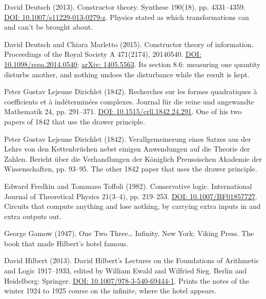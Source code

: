 \documentclass[11pt,twoside]{article}
\theoremstyle{thielethm}
\theoremstyle{thieledef}
\theoremstyle{thieledef}
\theoremstyle{thieledef}
\theoremstyle{thielethm}
\theoremstyle{thieleobs}
\theoremstyle{thielethm}
\begin{document}
\noindent David Deutsch (2013). Constructor theory. Synthese 190(18), pp. 4331--4359. \href{https://doi.org/10.1007/s11229-013-0279-z}{DOI: 10.1007/s11229-013-0279-z}. Physics stated as which transformations can and can't be brought about.
\par\medskip

\noindent David Deutsch and Chiara Marletto (2015). Constructor theory of information. Proceedings of the Royal Society A 471(2174), 20140540. \href{https://doi.org/10.1098/rspa.2014.0540}{DOI: 10.1098/rspa.2014.0540}; \href{https://arxiv.org/abs/1405.5563}{arXiv: 1405.5563}. Its section 8.6: measuring one quantity disturbs another, and nothing undoes the disturbance while the result is kept.
\par\medskip

\noindent Peter Gustav Lejeune Dirichlet (1842). Recherches sur les formes quadratiques \`a coefficients et \`a ind\'etermin\'ees complexes. Journal f\"ur die reine und angewandte Mathematik 24, pp. 291--371. \href{https://doi.org/10.1515/crll.1842.24.291}{DOI: 10.1515/crll.1842.24.291}. One of his two papers of 1842 that use the drawer principle.
\par\medskip

\noindent Peter Gustav Lejeune Dirichlet (1842). Verallgemeinerung eines Satzes aus der Lehre von den Kettenbr\"uchen nebst einigen Anwendungen auf die Theorie der Zahlen. Bericht \"uber die Verhandlungen der K\"oniglich Preussischen Akademie der Wissenschaften, pp. 93--95. The other 1842 paper that uses the drawer principle.
\par\medskip

\noindent Edward Fredkin and Tommaso Toffoli (1982). Conservative logic. International Journal of Theoretical Physics 21(3--4), pp. 219--253. \href{https://doi.org/10.1007/BF01857727}{DOI: 10.1007/BF01857727}. Circuits that compute anything and lose nothing, by carrying extra inputs in and extra outputs out.
\par\medskip

\noindent George Gamow (1947). One Two Three\ldots{} Infinity. New York: Viking Press. The book that made Hilbert's hotel famous.
\par\medskip

\noindent David Hilbert (2013). David Hilbert's Lectures on the Foundations of Arithmetic and Logic 1917--1933, edited by William Ewald and Wilfried Sieg. Berlin and Heidelberg: Springer. \href{https://doi.org/10.1007/978-3-540-69444-1}{DOI: 10.1007/978-3-540-69444-1}. Prints the notes of the winter 1924 to 1925 course on the infinite, where the hotel appears.
\par\medskip
\end{document}
